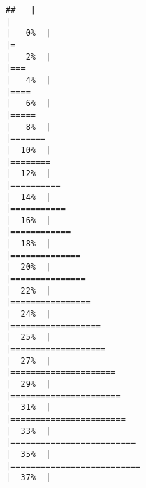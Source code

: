 \documentclass[
]{article}
\begin{document}
\begin{verbatim}
##   |                                                                              |                                                                      |   0%  |                                                                              |=                                                                     |   2%  |                                                                              |===                                                                   |   4%  |                                                                              |====                                                                  |   6%  |                                                                              |=====                                                                 |   8%  |                                                                              |=======                                                               |  10%  |                                                                              |========                                                              |  12%  |                                                                              |==========                                                            |  14%  |                                                                              |===========                                                           |  16%  |                                                                              |============                                                          |  18%  |                                                                              |==============                                                        |  20%  |                                                                              |===============                                                       |  22%  |                                                                              |================                                                      |  24%  |                                                                              |==================                                                    |  25%  |                                                                              |===================                                                   |  27%  |                                                                              |=====================                                                 |  29%  |                                                                              |======================                                                |  31%  |                                                                              |=======================                                               |  33%  |                                                                              |=========================                                             |  35%  |                                                                              |==========================                                            |  37%  |                                                                              
\end{verbatim}
\end{document}
